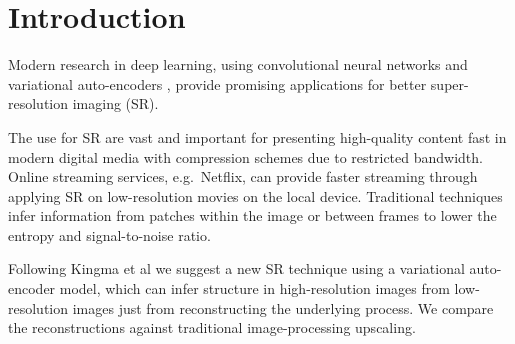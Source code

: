 \section{Introduction}
\label{sec:introduction}
Modern research in deep learning, using convolutional neural networks \cite{Dong15} and variational auto-encoders \cite{Kingma2013, Johnson16}, provide promising applications for better super-resolution imaging (SR).  

The use for SR are vast and important for presenting high-quality content fast in modern digital media with compression schemes due to restricted bandwidth. Online streaming services, e.g.\ Netflix, can provide faster streaming through applying SR on low-resolution movies on the local device. Traditional techniques infer information from patches within the image or between frames to lower the entropy and signal-to-noise ratio. 

Following Kingma et al \cite{Kingma2013} we suggest a new SR technique using a variational auto-encoder model, which can infer structure in high-resolution images from low-resolution images just from reconstructing the underlying process. We compare the reconstructions against traditional image-processing upscaling.


